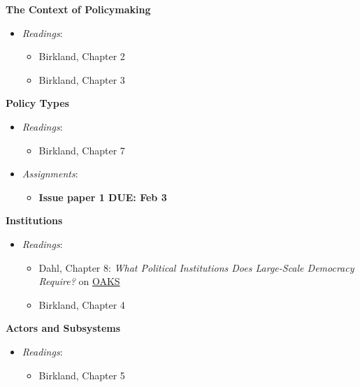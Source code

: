 \week \textbf{The Context of Policymaking}

\begin{itemize}

\item
  \emph{Readings}:

  \begin{itemize}
  
  \item
    Birkland, Chapter 2
  \item
    Birkland, Chapter 3
  \end{itemize}
\end{itemize}

\week \textbf{Policy Types}

\begin{itemize}

\item
  \emph{Readings}:

  \begin{itemize}
  
  \item
    Birkland, Chapter 7
  \end{itemize}
\item
  \emph{Assignments}:

  \begin{itemize}
  
  \item
    \textbf{Issue paper 1 DUE: Feb 3}
  \end{itemize}
\end{itemize}

\week \textbf{Institutions}

\begin{itemize}

\item
  \emph{Readings}:

  \begin{itemize}
  
  \item
    Dahl, Chapter 8: \emph{What Political Institutions Does Large-Scale
    Democracy Require?} on \href{https://lms.cofc.edu}{OAKS}
  \item
    Birkland, Chapter 4
  \end{itemize}
\end{itemize}

\week \textbf{Actors and Subsystems}

\begin{itemize}

\item
  \emph{Readings}:

  \begin{itemize}
  
  \item
    Birkland, Chapter 5
  \end{itemize}
\end{itemize}

